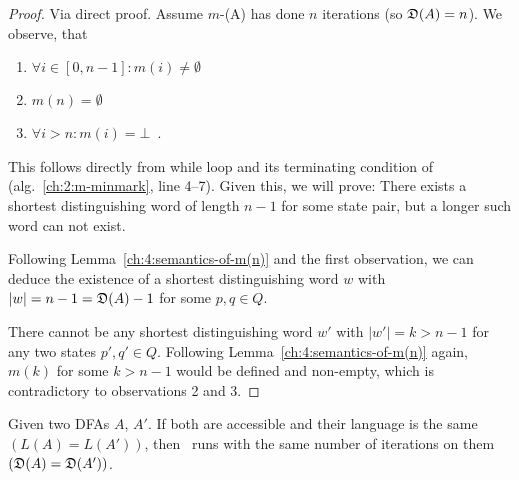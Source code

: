 \begin{proof}
	Via direct proof. Assume $m$-\CompDist(A) has done $n$ iterations (so $\mathfrak{D}(A) = n$). We observe, that
	\begin{enumerate}
		\item $\forall i \in [0,n-1]\colon m(i) \neq \emptyset$
		\item $m(n)= \emptyset$
		\item $\forall i > n\colon m(i)= \bot$\ .
	\end{enumerate}
	This follows directly from while loop and its terminating condition of \CompDist (alg.~\ref{ch:2:m-minmark}, line 4--7). Given this, we will prove: There exists a shortest distinguishing word of length $n-1$ for some state pair, but a longer such word can not exist.

	
	Following Lemma~\ref{ch:4:semantics-of-m(n)} and the first observation, we can deduce the existence of a shortest distinguishing word $w$ with $|w| = n-1 = \mathfrak{D}(A)-1$ for some $p,q \in Q$.
	
	
	There cannot be any shortest distinguishing word $w'$ with $|w'| = k > n-1$ for any two states $p',q'\in Q$. Following Lemma~\ref{ch:4:semantics-of-m(n)} again, $m(k)$ for some $k > n-1$ would be defined and non-empty, which is contradictory to observations 2 and 3.
\end{proof}

\begin{theorem}\label{ch:4:th-D}
	Given two DFAs $A$, $A'$. If both are accessible and their language is the same $(L(A) = L(A'))$, then \CompDist\ runs with the same number of iterations on them $(\mathfrak{D}(A) = \mathfrak{D}(A'))$.
\end{theorem}

